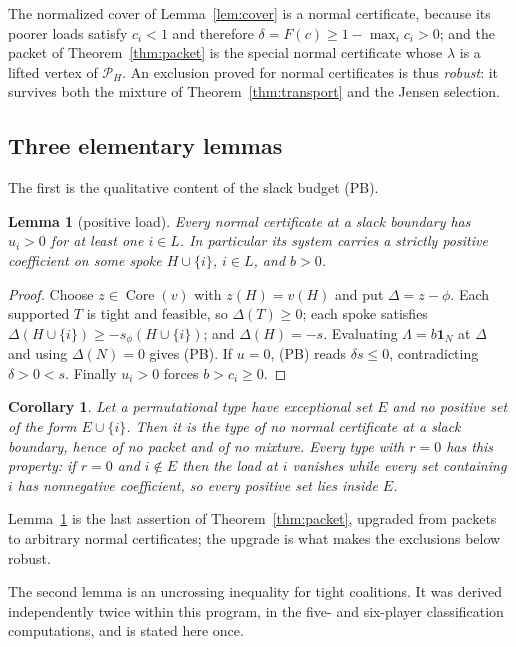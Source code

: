 \documentclass[11pt]{article}
\newtheorem{lemma}[theorem]{Lemma}
\newtheorem{corollary}[theorem]{Corollary}
\newcommand{\core}{\operatorname{Core}}
\newcommand{\one}{\mathbf 1}
\begin{document}
The normalized cover of Lemma~\ref{lem:cover} is a normal certificate, because
its poorer loads satisfy $c_i<1$ and therefore
$\delta=F(c)\ge1-\max_ic_i>0$; and the packet of Theorem~\ref{thm:packet} is
the special normal certificate whose $\lambda$ is a lifted vertex of
$\mathcal P_H$.  An exclusion proved for normal certificates is thus
\emph{robust}: it survives both the mixture of Theorem~\ref{thm:transport} and
the Jensen selection.

\subsection{Three elementary lemmas}

The first is the qualitative content of the slack budget (PB).

\begin{lemma}[positive load]\label{sel:lem:spoke}
Every normal certificate at a slack boundary has $u_i>0$ for at least one
$i\in L$.  In particular its system carries a strictly positive coefficient
on some \emph{spoke} $H\cup\{i\}$, $i\in L$, and $b>0$.
\end{lemma}

\begin{proof}
Choose $z\in\core(v)$ with $z(H)=v(H)$ and put $\Delta=z-\phi$.  Each supported
$T$ is tight and feasible, so $\Delta(T)\ge0$; each spoke satisfies
$\Delta(H\cup\{i\})\ge-s_\phi(H\cup\{i\})$; and $\Delta(H)=-s$.  Evaluating
$\Lambda=b\one_N$ at $\Delta$ and using $\Delta(N)=0$ gives (PB).  If $u=0$,
(PB) reads $\delta s\le0$, contradicting $\delta>0<s$.  Finally $u_i>0$ forces
$b>c_i\ge0$.
\end{proof}

\begin{corollary}\label{sel:cor:spoke}
Let a permutational type have exceptional set $E$ and no positive set of the
form $E\cup\{i\}$.  Then it is the type of no normal certificate at a slack
boundary, hence of no packet and of no mixture.  Every type with $r=0$ has this
property: if $r=0$ and $i\notin E$ then the load at $i$ vanishes while every
set containing $i$ has nonnegative coefficient, so every positive set lies
inside $E$.
\end{corollary}

Lemma~\ref{sel:lem:spoke} is the last assertion of
Theorem~\ref{thm:packet}, upgraded from packets to arbitrary normal
certificates; the upgrade is what makes the exclusions below robust.

The second lemma is an uncrossing inequality for tight coalitions.  It was
derived independently twice within this program, in the five- and six-player
classification computations, and is stated here once.
\end{document}
